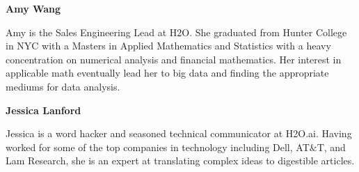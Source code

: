 \textbf{Amy Wang}

Amy is the Sales Engineering Lead at H2O. She graduated from Hunter College in NYC with a Masters in Applied Mathematics and Statistics with a heavy concentration on numerical analysis and financial mathematics. Her interest in applicable math eventually lead her to big data and finding the appropriate mediums for data analysis.

\textbf{Jessica Lanford}

Jessica is a word hacker and seasoned technical communicator at H2O.ai. Having worked for some of the top companies in technology including Dell, AT$\&$T, and Lam Research, she is an expert at translating complex ideas to digestible articles.


